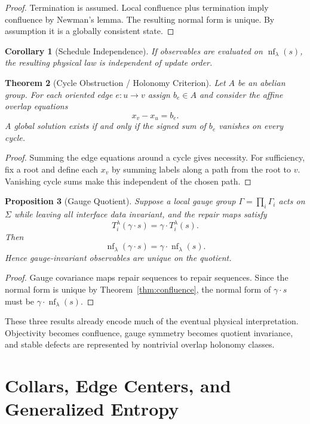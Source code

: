 \documentclass[11pt]{article}
\newtheorem{theorem}{Theorem}[section]
\newtheorem{corollary}[theorem]{Corollary}
\newtheorem{proposition}[theorem]{Proposition}
\newcommand{\nf}{\operatorname{nf}}
\begin{document}
\begin{proof}
Termination is assumed. Local confluence plus termination imply confluence by Newman's lemma. The resulting normal form is unique. By assumption it is a globally consistent state.
\end{proof}

\begin{corollary}[Schedule Independence]
If observables are evaluated on $\nf_\lambda(s)$, the resulting physical law is independent of update order.
\end{corollary}

\begin{theorem}[Cycle Obstruction / Holonomy Criterion]\label{thm:holonomy}
Let $A$ be an abelian group. For each oriented edge $e:u\to v$ assign $b_e\in A$ and consider the affine overlap equations
\[
x_v-x_u=b_e.
\]
A global solution exists if and only if the signed sum of $b_e$ vanishes on every cycle.
\end{theorem}

\begin{proof}
Summing the edge equations around a cycle gives necessity. For sufficiency, fix a root and define each $x_v$ by summing labels along a path from the root to $v$. Vanishing cycle sums make this independent of the chosen path.
\end{proof}

\begin{proposition}[Gauge Quotient]\label{prop:gauge}
Suppose a local gauge group $\Gamma=\prod_i \Gamma_i$ acts on $\Sigma$ while leaving all interface data invariant, and the repair maps satisfy
\[
T_i^\lambda(\gamma\cdot s)=\gamma\cdot T_i^\lambda(s).
\]
Then
\[
\nf_\lambda(\gamma\cdot s)=\gamma\cdot \nf_\lambda(s).
\]
Hence gauge-invariant observables are unique on the quotient.
\end{proposition}

\begin{proof}
Gauge covariance maps repair sequences to repair sequences. Since the normal form is unique by Theorem~\ref{thm:confluence}, the normal form of $\gamma\cdot s$ must be $\gamma\cdot \nf_\lambda(s)$.
\end{proof}

These three results already encode much of the eventual physical interpretation. Objectivity becomes confluence, gauge symmetry becomes quotient invariance, and stable defects are represented by nontrivial overlap holonomy classes.

\section{Collars, Edge Centers, and Generalized Entropy}
\end{document}
